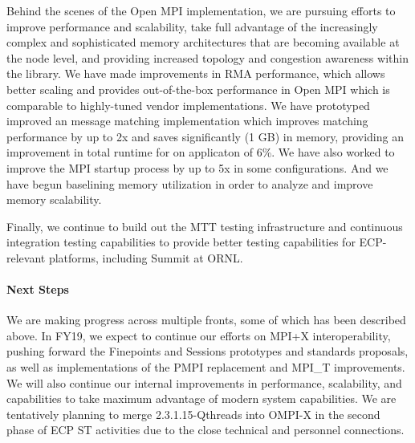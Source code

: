 Behind the scenes of the Open MPI implementation, we are pursuing
efforts to improve performance and scalability, take full advantage of
the increasingly complex and sophisticated memory architectures that
are becoming available at the node level, and providing increased
topology and congestion awareness within the library.  We have made
improvements in RMA performance, which allows better scaling and
provides out-of-the-box performance in Open MPI which is comparable to
highly-tuned vendor implementations.  We have prototyped improved an
message matching implementation which improves matching performance by
up to 2x and saves significantly (1 GB) in memory, providing an
improvement in total runtime for on applicaton of 6\%.  We have also
worked to improve the MPI startup process by up to 5x in some
configurations.  And we have begun baselining memory utilization
in order to analyze and improve memory scalability.


%
Finally, we continue to build out the MTT testing infrastructure and
continuous integration testing capabilities to provide better testing
capabilities for ECP-relevant platforms, including Summit at ORNL.

\paragraph{Next Steps}
We are making progress across multiple fronts, some of which has been
described above.  In FY19, we expect to continue our efforts on MPI+X
interoperability, pushing forward the Finepoints and Sessions
prototypes and standards proposals, as well as implementations of the
PMPI replacement and MPI\_T improvements.  We will also continue our
internal improvements in performance, scalability, and capabilities to
take maximum advantage of modern system capabilities. We are
tentatively planning to merge 2.3.1.15-Qthreads into OMPI-X in the
second phase of ECP ST activities due to the close technical and
personnel connections.
